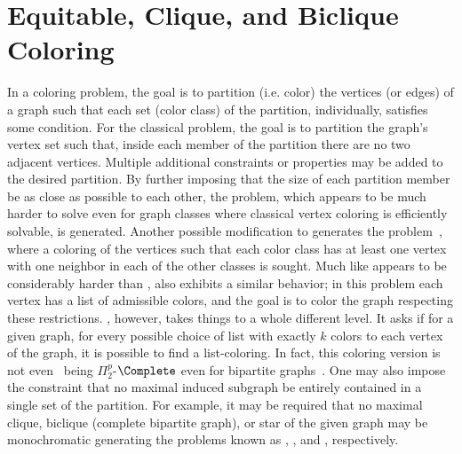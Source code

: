 \chapter{Equitable, Clique, and Biclique Coloring}
\label{ch:coloring}

In a coloring problem, the goal is to partition (i.e. color) the vertices (or edges) of a graph such that each set (color class) of the partition, individually, satisfies some condition.
For the classical  problem, the goal is to partition the graph's vertex set such that, inside each member of the partition there are no two adjacent vertices.
Multiple additional constraints or properties may be added to the desired partition.
By further imposing that the size of each partition member be as close as possible to each other, the  problem, which appears to be much harder to solve even for graph classes where classical vertex coloring is efficiently solvable, is generated.
Another possible modification to  generates the  problem~\citep{b_coloring}, where a coloring of the vertices such that each color class has at least one vertex with one neighbor in each of the other classes is sought.
Much like  appears to be considerably harder than ,  also exhibits a similar behavior; in this problem each vertex has a list of admissible colors, and the goal is to color the graph respecting these restrictions.
, however, takes things to a whole different level.
It asks if for a given graph, for every possible choice of list with exactly $k$ colors to each vertex of the graph, it is possible to find a list-coloring.
In fact, this coloring version is not even \NPc\, being $\Pi_2^p$-$\Complete$ even for bipartite graphs~\citep{choosability_complexity}.
One may also impose the constraint that no maximal induced subgraph be entirely contained in a single set of the partition.
For example, it may be required that no maximal clique, biclique (complete bipartite graph), or star of the given graph may be monochromatic generating the problems known as ,  , and , respectively.

